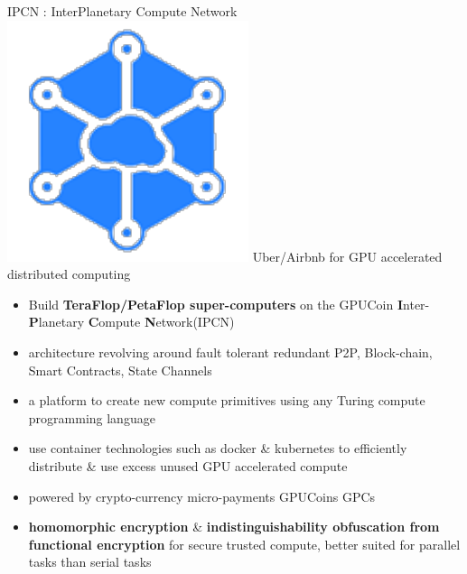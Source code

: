 \begin{frame}[t]{IPCN
	: InterPlanetary Compute Network}
	\includegraphics[scale=.15]{static/ipcn-p2p}
	 Uber/Airbnb for GPU accelerated distributed computing
 \begin{itemize}[<+-| alert@+>]
 \item Build \textbf{TeraFlop/PetaFlop super-computers} on the GPUCoin \textbf{I}nter-\textbf{P}lanetary \textbf{C}ompute \textbf{N}etwork(IPCN)
 \item architecture revolving around fault tolerant redundant P2P, Block-chain, Smart Contracts, State Channels
 \item a platform to create new compute primitives using any Turing compute programming language
 \item use container technologies such as docker \& kubernetes to efficiently distribute \& use excess unused GPU accelerated compute
 \item powered by crypto-currency micro-payments GPUCoins GPCs
 \item \textbf{homomorphic encryption} \& \textbf{indistinguishability obfuscation from functional encryption} for secure trusted compute, better suited for parallel tasks than serial tasks
 \end{itemize}
\end{frame}